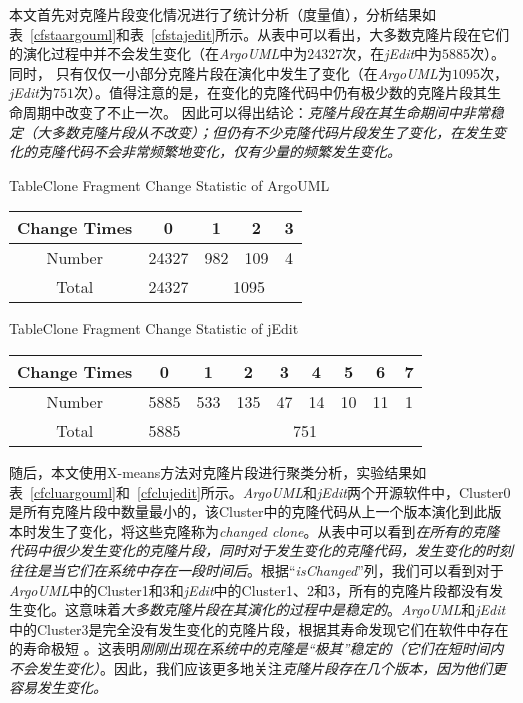 本文首先对克隆片段变化情况进行了统计分析（度量值），分析结果如表~\ref{cfstaargouml}和表~\ref{cfstajedit}所示。从表中可以看出，大多数克隆片段在它们的演化过程中并不会发生变化（在{\em ArgoUML}中为$24327$次，在{\em  jEdit}中为$5885$次）。同时， 只有仅仅一小部分克隆片段在演化中发生了变化（在{\em  ArgoUML}为$1095$次，{\em jEdit}为$751$次）。值得注意的是，在变化的克隆代码中仍有极少数的克隆片段其生命周期中改变了不止一次。 因此可以得出结论：{\em 克隆片段在其生命期间中非常稳定（大多数克隆片段从不改变）；但仍有不少克隆代码片段发生了变化，在发生变化的克隆代码不会非常频繁地变化，仅有少量的频繁发生变化。}

\begin{table}[htbp]
{Table$\!$}{Clone Fragment  Change Statistic of ArgoUML}
\vspace{0.5em}
\centering
\wuhao
\begin{tabular}{ccccc}
\toprule[1.5pt]
Change Times&0&1&2&3\\ 
\midrule[1pt]
Number&24327&982&109&4\\ 
Total&24327&\multicolumn{3}{c}{1095} \\
\bottomrule[1.5pt]
\end{tabular}
\end{table}

\begin{table}[htbp]
{Table$\!$}{Clone Fragment  Change Statistic of jEdit}
\vspace{0.5em}
\centering
\wuhao
\begin{tabular}{ccccccccc}
\toprule[1.5pt]
Change Times &0&1&2&3&4&5&6&7\\ 
\midrule[1pt]
Number&5885&533&135&47&14&10&11&1\\ 
Total&5885&\multicolumn{7}{c}{751}   \\ 
\bottomrule[1.5pt]
\end{tabular}
\end{table}

随后，本文使用X-means方法对克隆片段进行聚类分析，实验结果如表~\ref{cfcluargouml}和~\ref{cfclujedit}所示。{\em ArgoUML}和{\em jEdit}两个开源软件中，Cluster0是所有克隆片段中数量最小的，该Cluster中的克隆代码从上一个版本演化到此版本时发生了变化，将这些克隆称为{\em changed clone}。从表中可以看到{\em 在所有的克隆代码中很少发生变化的克隆片段，同时对于发生变化的克隆代码，发生变化的时刻往往是当它们在系统中存在一段时间后}。根据``{\em isChanged}''列，我们可以看到对于{\em  ArgoUML}中的Cluster1和3和{\em  jEdit}中的Cluster1、2和3，所有的克隆片段都没有发生变化。这意味着{\em 大多数克隆片段在其演化的过程中是稳定的}。{\em ArgoUML}和{\em jEdit}中的Cluster3是完全没有发生变化的克隆片段，根据其寿命发现它们在软件中存在的寿命极短 。这表明{\em 刚刚出现在系统中的克隆是“极其”稳定的（它们在短时间内不会发生变化）}。因此，我们应该更多地关注{\em 克隆片段存在几个版本，因为他们更容易发生变化。}


